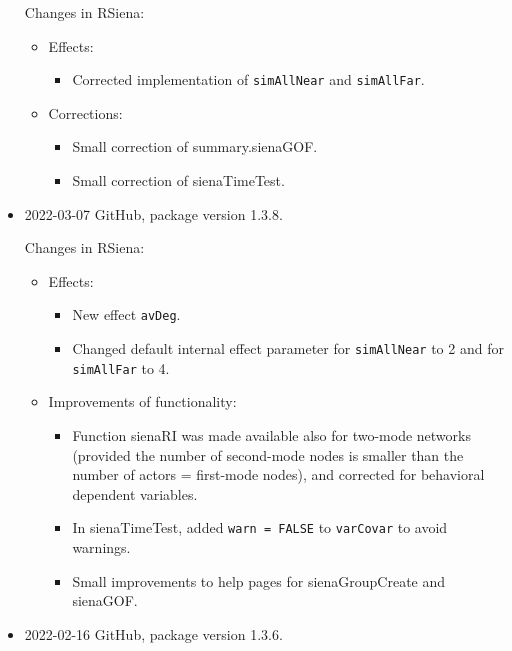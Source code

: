 \documentclass[a4paper,fleqn,11pt]{article}
\newcommand{\+}{\, + \,}
\newcommand{\sfn}[1]{\textsf{#1}}
\begin{document}
\begin{small}
\begin{itemize}
Changes in RSiena:
\begin{itemize}
\item  Effects:
\begin{itemize}
  \item Corrected implementation of \texttt{simAllNear} and
    \texttt{simAllFar}.
\end{itemize}
\item Corrections:
\begin{itemize}
   \item  Small correction of \sfn{summary.sienaGOF}.
   \item  Small correction of \textsf{sienaTimeTest}.
\end{itemize}

\end{itemize}



\item 2022-03-07 GitHub, package version 1.3.8.

Changes in RSiena:
\begin{itemize}
\item  Effects:
\begin{itemize}
  \item New effect \texttt{avDeg}.
  \item Changed default internal effect parameter for \texttt{simAllNear} to 2 and for
    \texttt{simAllFar} to 4.
\end{itemize}
\item Improvements of functionality:
\begin{itemize}
   \item Function \sfn{sienaRI} was made available also for two-mode networks
     (provided the number of second-mode nodes is smaller than the
	 number of actors = first-mode nodes), and corrected
	 for behavioral dependent variables.
  \item In \textsf{sienaTimeTest}, added \texttt{warn = FALSE} to
      \texttt{varCovar} to avoid warnings.
  \item Small improvements to help pages for \sfn{sienaGroupCreate} and
  \textsf{sienaGOF}.

\end{itemize}

\end{itemize}


\item 2022-02-16 GitHub, package version 1.3.6.


\end{itemize}
\end{small}
\end{document}

